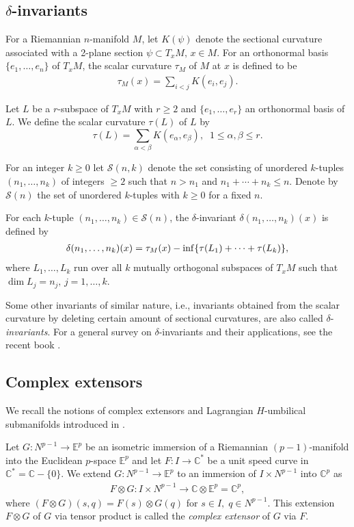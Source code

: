 \documentclass{amsart}
\theoremstyle{plain}
\numberwithin{equation}{section}
\theoremstyle{remark}
\numberwithin{equation}{section}
\begin{document}
\subsection{$\delta$-invariants}
For a  Riemannian $n$-manifold $M$, let $K(\psi)$ denote the sectional curvature associated with a 2-plane section $\psi\subset T_xM,\,x\in M$. For an orthonormal basis $\{e_1,\ldots,e_n\}$ of $T_xM$, the scalar curvature $\tau_{M}$ of $M$ at $x$ is defined to be \begin{align}\tau_{M}(x)=\sum_{i<j} K(e_i, e_j).\end{align}

Let $L$ be a $r$-subspace of $T_xM$ with $r\geq 2$  and $\{e_1,\ldots,e_r\}$ an orthonormal basis of $L$. We define the scalar curvature $\tau(L)$ of $L$ by  
$$\tau(L)=\sum_{\alpha<\beta} K(e_\alpha, e_\beta),\;\; 1\leq\alpha,\beta\leq r.$$

For an integer $k\geq 0$ let  ${\mathcal S}(n,k)$ denote the set consisting of unordered $k$-tuples $(n_1,\ldots,n_k)$ of integers $\geq 2$ such that  $ n>n_1$ and $ n_1+\cdots+n_k\leq n.$ Denote by ${\mathcal S}(n)$ the set of unordered $k$-tuples with $k\geq 0$ for a fixed $n$. 

 For each $k$-tuple $(n_1,\ldots,n_k)\in {\mathcal S}(n)$, the $\delta$-invariant $\delta{(n_1,\ldots,n_k)}(x)$ is defined by 
\begin{align}\notag \delta (n_1,\ldots,n_k)(x)=\tau_{M}(x)-\inf\{\tau(L_1)+\cdots+\tau(L_k)\}, \end{align}
where $L_1,\ldots,L_k$ run over all $k$ mutually orthogonal subspaces of $T_xM$ such that  $\dim L_j=n_j,\, j=1,\ldots,k$.

Some other invariants of similar nature, i.e., invariants obtained from the scalar curvature by deleting certain amount of sectional curvatures,  are also called $\delta$-{\it invariants}. For a general survey on $\delta$-invariants and their applications, see the recent book \cite{c11}. 

\subsection{Complex extensors}
We recall the notions of complex extensors and Lagrangian $H$-umbilical submanifolds introduced in \cite{c4.1}.  

Let $G:N^{p-1}\rightarrow \mathbb E^p$ be an isometric immersion of a Riemannian $(p-1)$-manifold into the Euclidean $p$-space $\mathbb E^p$ and let $F:I\rightarrow {\mathbb C}^*$ be a unit speed curve in  ${\mathbb C}^*={\mathbb C}-\{0\}$. We extend $G:N^{p-1}\rightarrow \mathbb E^p$ to an immersion of $I\times
N^{p-1}$ into  ${\mathbb C}^p$  as
 \begin{align}F\otimes G:I\times N^{p-1}\rightarrow {\mathbb C}\otimes \mathbb E^p={\mathbb C}^p,\end{align}
where
$(F\otimes G)(s,q)=F(s)\otimes G(q)$ for $ s\in I, \; q\in N^{p-1}.$ This extension $F\otimes G$ of $G$ via tensor product is called the {\it complex extensor\/} of $G$ via $F$.
\end{document}
